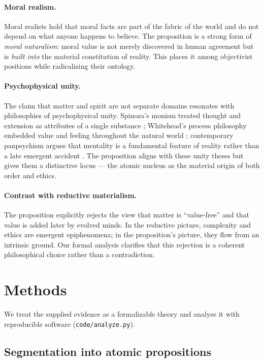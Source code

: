 \documentclass[11pt,a4paper]{article}
\begin{document}
\paragraph{Moral realism.}
Moral realists hold that moral facts are part of the fabric of the world and
do not depend on what anyone happens to believe. The proposition is a strong
form of \emph{moral naturalism}: moral value is not merely discovered in human
agreement but is \emph{built into} the material constitution of reality. This
places it among objectivist positions while radicalizing their ontology.

\paragraph{Psychophysical unity.}
The claim that matter and spirit are not separate domains resonates with
philosophies of psychophysical unity. Spinoza's monism treated thought and
extension as attributes of a single substance \cite{spinoza}; Whitehead's
process philosophy embedded value and feeling throughout the natural world
\cite{whitehead}; contemporary panpsychism argues that mentality is a
fundamental feature of reality rather than a late emergent accident
\cite{chalmers,goff}. The proposition aligns with these unity theses but gives
them a distinctive locus --- the atomic nucleus as the material origin of
both order and ethics.

\paragraph{Contrast with reductive materialism.}
The proposition explicitly rejects the view that matter is ``value-free''
and that value is added later by evolved minds. In the reductive picture,
complexity and ethics are emergent epiphenomena; in the proposition's picture,
they flow from an intrinsic ground. Our formal analysis clarifies that this
rejection is a coherent philosophical choice rather than a contradiction.

\section{Methods}
\label{sec:methods}

We treat the supplied evidence as a formalizable theory and analyse it with
reproducible software (\texttt{code/analyze.py}).

\subsection{Segmentation into atomic propositions}
\label{sec:segmentation}
\end{document}
